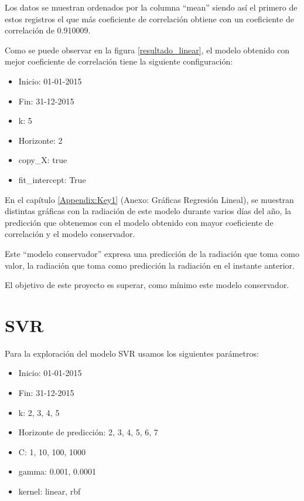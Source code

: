 Los datos se muestran ordenados por la columna ``mean'' siendo así el primero de estos registros el que más coeficiente de correlación obtiene con un coeficiente de correlación de 0.910009.

Como se puede observar en la figura \ref{resultado_linear}, el modelo obtenido con mejor coeficiente de correlación tiene la siguiente configuración:

\begin{itemize}
\item Inicio: 01-01-2015
\item Fin: 31-12-2015
\item k: 5
\item Horizonte: 2
\item copy\_X: true
\item fit\_intercept: True
\end{itemize}

En el capítulo \ref{Appendix:Key1} (Anexo: Gráficas Regresión Lineal), se muestran distintas gráficas con la radiación de este modelo durante varios días del año, la predicción que obtenemos con el modelo obtenido con mayor coeficiente de correlación y el modelo conservador.

Este ``modelo conservador'' expresa una predicción de la radiación que toma como valor, la radiación que toma como predicción la radiación en el instante anterior.

El objetivo de este proyecto es superar, como mínimo este modelo conservador.


\section{SVR}
\label{makereference7.2}

Para la exploración del modelo SVR usamos los siguientes parámetros:

\begin{itemize}
\item Inicio: 01-01-2015
\item Fin: 31-12-2015
\item k: 2, 3, 4, 5
\item Horizonte de predicción: 2, 3, 4, 5, 6, 7
\item C: 1, 10, 100, 1000
\item gamma: 0.001, 0.0001
\item kernel: linear, rbf 
\end{itemize}

